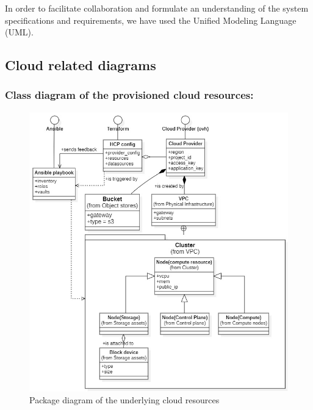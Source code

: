 In order to facilitate collaboration and formulate an understanding of the system specifications and requirements, we have used the Unified Modeling Language (UML). 

\subsection{Cloud related diagrams }

\subsubsection{Class diagram of the provisioned cloud resources:}

\begin{figure}[H]\centering
\includegraphics[width=1.0\textwidth,angle=00]{assets/f2.jpg}
\caption{Package diagram of the underlying cloud resources}
\label{fig:Package diagram of the underlying cloud resources}
\end{figure}


